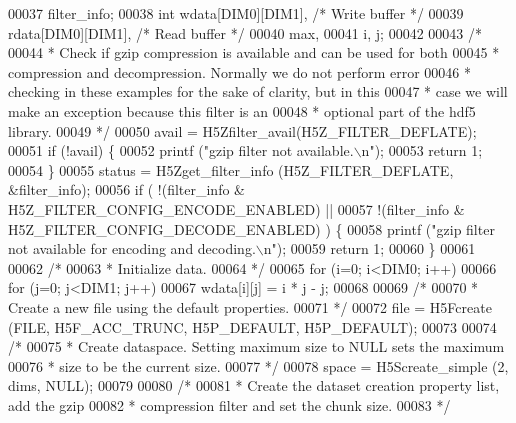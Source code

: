 \begin{DoxyCode}
00037                     filter\_info;
00038     \textcolor{keywordtype}{int}             wdata[DIM0][DIM1],          \textcolor{comment}{/* Write buffer */}
00039                     rdata[DIM0][DIM1],          \textcolor{comment}{/* Read buffer */}
00040                     max,
00041                     i, j;
00042 
00043     \textcolor{comment}{/*}
00044 \textcolor{comment}{     * Check if gzip compression is available and can be used for both}
00045 \textcolor{comment}{     * compression and decompression.  Normally we do not perform error}
00046 \textcolor{comment}{     * checking in these examples for the sake of clarity, but in this}
00047 \textcolor{comment}{     * case we will make an exception because this filter is an}
00048 \textcolor{comment}{     * optional part of the hdf5 library.}
00049 \textcolor{comment}{     */}
00050     avail = H5Zfilter\_avail(H5Z\_FILTER\_DEFLATE);
00051     \textcolor{keywordflow}{if} (!avail) \{
00052         printf (\textcolor{stringliteral}{"gzip filter not available.\(\backslash\)n"});
00053         \textcolor{keywordflow}{return} 1;
00054     \}
00055     status = H5Zget\_filter\_info (H5Z\_FILTER\_DEFLATE, &filter\_info);
00056     \textcolor{keywordflow}{if} ( !(filter\_info & H5Z\_FILTER\_CONFIG\_ENCODE\_ENABLED) ||
00057                 !(filter\_info & H5Z\_FILTER\_CONFIG\_DECODE\_ENABLED) ) \{
00058         printf (\textcolor{stringliteral}{"gzip filter not available for encoding and decoding.\(\backslash\)n"});
00059         \textcolor{keywordflow}{return} 1;
00060     \}
00061 
00062     \textcolor{comment}{/*}
00063 \textcolor{comment}{     * Initialize data.}
00064 \textcolor{comment}{     */}
00065     \textcolor{keywordflow}{for} (i=0; i<DIM0; i++)
00066         \textcolor{keywordflow}{for} (j=0; j<DIM1; j++)
00067             wdata[i][j] = i * j - j;
00068 
00069     \textcolor{comment}{/*}
00070 \textcolor{comment}{     * Create a new file using the default properties.}
00071 \textcolor{comment}{     */}
00072     file = H5Fcreate (FILE, H5F\_ACC\_TRUNC, H5P\_DEFAULT, H5P\_DEFAULT);
00073 
00074     \textcolor{comment}{/*}
00075 \textcolor{comment}{     * Create dataspace.  Setting maximum size to NULL sets the maximum}
00076 \textcolor{comment}{     * size to be the current size.}
00077 \textcolor{comment}{     */}
00078     space = H5Screate\_simple (2, dims, NULL);
00079 
00080     \textcolor{comment}{/*}
00081 \textcolor{comment}{     * Create the dataset creation property list, add the gzip}
00082 \textcolor{comment}{     * compression filter and set the chunk size.}
00083 \textcolor{comment}{     */}

\end{DoxyCode}
